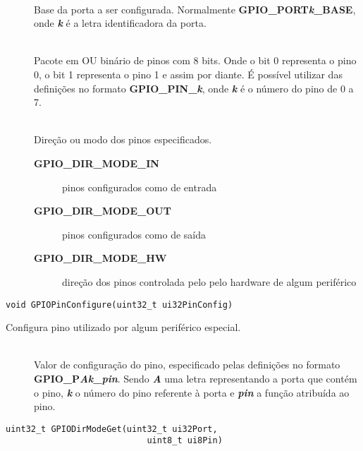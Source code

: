 \begin{description}
	\item []\hfill \\
	Base da porta a ser configurada. Normalmente \textbf{GPIO\_PORT\emph{k}\_BASE}, onde \textbf{\emph{k}} é a letra identificadora da porta.
	
	\item []\hfill \\
	Pacote em OU binário de pinos com 8 bits. Onde o bit 0 representa o pino 0, o bit 1 representa o pino 1 e assim por diante. É possível utilizar das definições no formato  \textbf{GPIO\_PIN\_\emph{k}}, onde \textbf{\emph{k}} é o número do pino de 0 a 7.
	
	\item []\hfill \\
	Direção ou modo dos pinos especificados.
	
	\begin{description}
		\item [\textbf{GPIO\_DIR\_MODE\_IN}] pinos configurados como de entrada
		\item [\textbf{GPIO\_DIR\_MODE\_OUT}] pinos configurados como de saída
		\item [\textbf{GPIO\_DIR\_MODE\_HW}] direção dos pinos controlada pelo pelo hardware de algum periférico
	\end{description}
\end{description}

\begin{lstlisting}[style=funcao]
	void GPIOPinConfigure(uint32_t ui32PinConfig)
\end{lstlisting}

Configura pino utilizado por algum periférico especial.

\begin{description}
	\item []\hfill \\
	Valor de configuração do pino, especificado pelas definições no formato \\ \textbf{GPIO\_P\emph{Ak}\_\emph{pin}}. Sendo \textbf{\emph{A}} uma letra representando a porta que contém o pino, \textbf{\emph{k}} o número do pino referente à porta e \textbf{\emph{pin}} a função atribuída ao pino.
\end{description}

\begin{lstlisting}[style=funcao]
	uint32_t GPIODirModeGet(uint32_t ui32Port,
							uint8_t ui8Pin)
\end{lstlisting}

